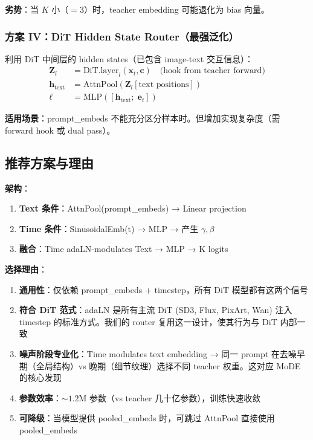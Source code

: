 \documentclass[11pt,a4paper]{article}
\theoremstyle{definition}
\begin{document}
\textbf{劣势}：当 $K$ 小（$=3$）时，teacher embedding 可能退化为 bias 向量。

\subsubsection{方案 IV：DiT Hidden State Router（最强泛化）}

利用 DiT 中间层的 hidden states（已包含 image-text 交互信息）：
\begin{align}
\mathbf{Z}_l &= \text{DiT.layer}_{l}(\mathbf{x}_t, \mathbf{c}) \quad \text{(hook from teacher forward)} \\
\mathbf{h}_{\text{text}} &= \text{AttnPool}(\mathbf{Z}_l[\text{text positions}]) \\
\bm{\ell} &= \text{MLP}([\mathbf{h}_{\text{text}};\; \mathbf{e}_t])
\end{align}

\textbf{适用场景}：prompt\_embeds 不能充分区分样本时。但增加实现复杂度（需 forward hook 或 dual pass）。

\subsection{推荐方案与理由}

\begin{tcolorbox}[colback=blue!5!white,colframe=blue!50!black,title=\textbf{最终推荐：方案 I (adaLN-style MLP + AttnPool)}]

\textbf{架构}：
\begin{enumerate}
    \item \textbf{Text 条件}：AttnPool(prompt\_embeds) → Linear projection
    \item \textbf{Time 条件}：SinusoidalEmb(t) → MLP → 产生 $\gamma, \beta$
    \item \textbf{融合}：Time adaLN-modulates Text → MLP → K logits
\end{enumerate}

\textbf{选择理由}：
\begin{enumerate}
    \item \textbf{通用性}：仅依赖 prompt\_embeds + timestep，所有 DiT 模型都有这两个信号
    \item \textbf{符合 DiT 范式}：adaLN 是所有主流 DiT (SD3, Flux, PixArt, Wan) 注入 timestep 的标准方式。我们的 router 复用这一设计，使其行为与 DiT 内部一致
    \item \textbf{噪声阶段专业化}：Time modulates text embedding → 同一 prompt 在去噪早期（全局结构）vs 晚期（细节纹理）选择不同 teacher 权重。这对应 MoDE 的核心发现
    \item \textbf{参数效率}：$\sim 1.2$M 参数（vs teacher 几十亿参数），训练快速收敛
    \item \textbf{可降级}：当模型提供 pooled\_embeds 时，可跳过 AttnPool 直接使用 pooled\_embeds
\end{enumerate}
\end{tcolorbox}
\end{document}
